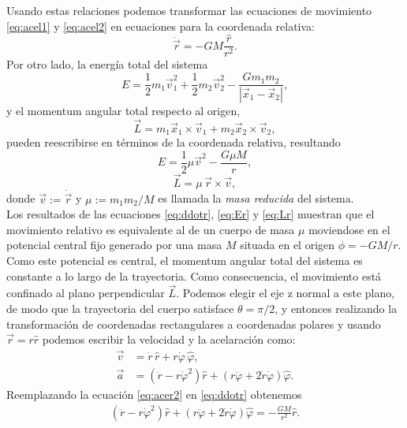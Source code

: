 Usando estas relaciones podemos transformar las ecuaciones de movimiento \ref{eq:acel1} y \ref{eq:acel2} en ecuaciones para la coordenada relativa:
\begin{equation}
    \ddot{\vec{r}}=-GM \frac{\hat{r}}{r^2}.
    \label{eq:ddotr}
\end{equation}
Por otro lado, la energía total del sistema
\begin{equation}
    E=\frac{1}{2}m_1\vec{v}_1^2+\frac{1}{2}m_2\vec{v}_2^2-\frac{Gm_1m_2}{|\vec{x}_1-\vec{x}_2|},
\end{equation}
y el momentum angular total respecto al origen,
\begin{equation}
    \vec{L}=m_1\vec{x}_1\times\vec{v}_1+m_2\vec{x}_2\times\vec{v}_2,
\end{equation}
pueden reescribirse en términos de la coordenada relativa, resultando
\begin{equation}\label{eq:Er}
    E=\frac{1}{2}\mu \vec{v}^2-\frac{G\mu M}{r},
\end{equation}
\begin{equation}\label{eq:Lr}
    \vec{L}=\mu\,\vec{r}\times\vec{v},
\end{equation}
donde $\vec{v}:=\dot{\vec{r}}$ y $\mu:=m_1m_2/M$ es llamada la \textit{masa reducida} del sistema.\\
Los resultados de las ecuaciones \ref{eq:ddotr}, \ref{eq:Er} y \ref{eq:Lr} muestran que el movimiento relativo es equivalente
al de un cuerpo de masa $\mu$ moviendose en el potencial central fijo generado por una masa $M$ situada en el origen 
$\phi=-GM/r$. Como este potencial es central, el momentum angular total del sistema es constante a lo largo de la trayectoria. 
Como consecuencia, el movimiento está confinado al plano perpendicular $\vec{L}$. Podemos elegir el eje z normal a este plano, de modo que la trayectoria del
cuerpo satisface $\theta=\pi/2$, y entonces realizando la transformación de coordenadas rectangulares a coordenadas polares y usando $\vec{r}=r\hat{r}$ podemos
escribir la velocidad y la acelaración como:
\begin{align}
    \vec{v} & = \dot{r}\,\hat{r}+r\dot{\varphi}\,\hat{\varphi} ,\label{eq:vel1}\\
    \vec{a} & = \left(\ddot{r}-r\dot{\varphi}^2\right)\hat{r} +\left(r\ddot{\varphi}+2\dot{r}\dot{\varphi}\right)\hat{\varphi} .\label{eq:acer2}
\end{align}
Reemplazando la ecuación \ref{eq:acer2} en \ref{eq:ddotr} obtenemos
\begin{eqnarray}
    \left(\ddot{r}-r\dot{\varphi}^2\right)\hat{r}+
    \left(r\ddot{\varphi}+2\dot{r}\dot{\varphi}\right)\hat{\varphi}
    =-\frac{GM}{r^2}\hat{r}.
\end{eqnarray}
